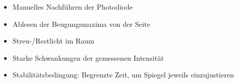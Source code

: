 \begin{itemize}
    \item Manuelles Nachführen der Photodiode
    \item Ablesen der Beugungsmaxima von der Seite
    \item Streu-/Restlicht im Raum
    \item Starke Schwankungen der gemessenen Intensität
    \item Stabilitätsbedingung: Begrenzte Zeit, um Spiegel jeweils einzujustieren
\end{itemize}
